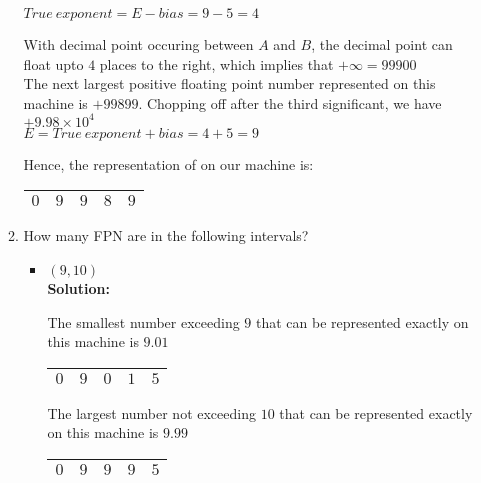 \documentclass{article}
\begin{document}
\begin{enumerate}
\begin{enumerate}
$True \ exponent = E - bias = 9 - 5 = 4$

With decimal point occuring between $A$ and $B$, the decimal point can float upto $4$
places to the right, which implies that $+\infty = 99900$ \\

The next largest positive floating point number represented on this machine is $+99899$.
Chopping off after the third significant, we have $+9.98 \times 10^{4}$ \\

$E = True \ exponent + bias = 4 + 5 = 9$

Hence, the representation of on our machine is:

\begin{center}
\renewcommand{\arraystretch}{1.7}
\begin{tabular}{|c|c|c|c|c|}
\hline
$0$ & $9$ & $9$ & $8$ & $9$ \\
\hline
\end{tabular}
\end{center}

\vspace{1cm}

\item How many FPN are in the following intervals? \\

\begin{itemize}
\item $(9, 10)$ \\

\textbf{Solution:}

The smallest number exceeding $9$ that can be represented exactly on this machine is
$9.01$
        
\begin{center}
\renewcommand{\arraystretch}{1.7}
\begin{tabular}{|c|c|c|c|c|}
\hline
$0$ & $9$ & $0$ & $1$ & $5$ \\
\hline
\end{tabular}
\end{center}

The largest number not exceeding $10$ that can be represented exactly on this 
machine is $9.99$ 

\begin{center}
\renewcommand{\arraystretch}{1.7}
\begin{tabular}{|c|c|c|c|c|}
\hline
$0$ & $9$ & $9$ & $9$ & $5$ \\
\hline
\end{tabular}
\end{center}


\end{itemize}
\end{enumerate}
\end{enumerate}
\end{document}
